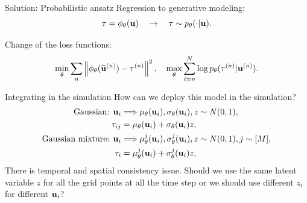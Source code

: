 \documentclass[aspectratio=169]{beamer}
\begin{document}
\begin{frame}{Solution: Probabilistic ansatz}
	Regression to generative modeling:
	\begin{equation*}
    \tau = \phi_{\theta}(\mathbf{u}) \quad \rightarrow \quad \tau \sim p_{\theta}(\cdot|\mathbf{u}).
	\end{equation*}

	Change of the loss functions:
	\begin{equation*}
   \min_{\theta} \sum_{n} \left\| \phi_{\theta}(\widetilde{\mathbf{u}}^{(n)}) - \tau^{(n)} \right\|^2,\quad
	 \max_{\theta}\sum_{i=n}^{N}\log p_{\theta}(\tau^{(n)}|\mathbf{u}^{(n)}).
	\end{equation*}
\end{frame}


\begin{frame}{Integrating in the simulation}
	How can we deploy this model in the simulation?
	\begin{equation*}
		\begin{aligned}
			\text{Gaussian: } \mathbf{u}_i & \Longrightarrow \mu_{\theta}(\mathbf{u}_i), \sigma_{\theta}(\mathbf{u}_i),
			z \sim N(0, 1), \\
			\tau_{ij} & = \mu_{\theta}(\mathbf{u}_i) + \sigma_{\theta}(\mathbf{u}_i)z,	\\
			\text{Gaussian mixture: } \mathbf{u}_i & \Longrightarrow \mu_{\theta}^j(\mathbf{u}_i), \sigma_{\theta}^j(\mathbf{u}_i),
			z \sim N(0, 1), j \sim [M], \\
			\tau_{i} & = \mu_{\theta}^j(\mathbf{u}_i) + \sigma_{\theta}^j(\mathbf{u}_i)z,	\\
		\end{aligned}
	\end{equation*}
	There is temporal and spatial consistency issue. Should we use the same
	latent variable $z$ for all the grid points at all the time step or we
	should use different $z_i$ for different $\mathbf{u}_i$?
\end{frame}
\end{document}
